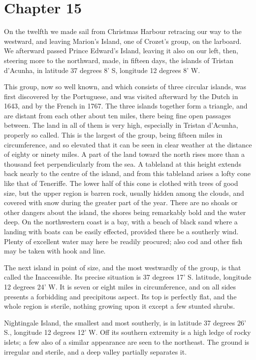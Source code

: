 \section{Chapter 15}
On the twelfth we made sail from Christmas Harbour retracing our way to the
westward, and leaving Marion's Island, one of Crozet's group, on the larboard.
We afterward passed Prince Edward's Island, leaving it also on our left, then,
steering more to the northward, made, in fifteen days, the islands of Tristan
d'Acunha, in latitude 37 degrees 8' S, longitude 12 degrees 8' W. 

This group, now so well known, and which consists of three circular islands,
was first discovered by the Portuguese, and was visited afterward by the Dutch
in 1643, and by the French in 1767. The three islands together form a triangle,
and are distant from each other about ten miles, there being fine open passages
between. The land in all of them is very high, especially in Tristan d'Acunha,
properly so called. This is the largest of the group, being fifteen miles in
circumference, and so elevated that it can be seen in clear weather at the
distance of eighty or ninety miles. A part of the land toward the north rises
more than a thousand feet perpendicularly from the sea. A tableland at this
height extends back nearly to the centre of the island, and from this tableland
arises a lofty cone like that of Teneriffe. The lower half of this cone is
clothed with trees of good size, but the upper region is barren rock, usually
hidden among the clouds, and covered with snow during the greater part of the
year. There are no shoals or other dangers about the island, the shores being
remarkably bold and the water deep. On the northwestern coast is a bay, with a
beach of black sand where a landing with boats can be easily effected, provided
there be a southerly wind. Plenty of excellent water may here be readily
procured; also cod and other fish may be taken with hook and line. 

The next island in point of size, and the most westwardly of the group, is
that called the Inaccessible. Its precise situation is 37 degrees 17' S.
latitude, longitude 12 degrees 24' W. It is seven or eight miles in
circumference, and on all sides presents a forbidding and precipitous aspect.
Its top is perfectly flat, and the whole region is sterile, nothing growing upon
it except a few stunted shrubs. 

Nightingale Island, the smallest and most southerly, is in latitude 37
degrees 26' S., longitude 12 degrees 12' W. Off its southern extremity is a high
ledge of rocky islets; a few also of a similar appearance are seen to the
northeast. The ground is irregular and sterile, and a deep valley partially
separates it. 

